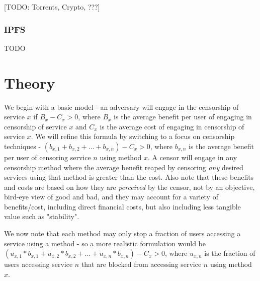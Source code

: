 \documentclass[12pt]{report}
\begin{document}
[TODO: Torrents, Crypto, ???]

\subsection{IPFS}

TODO

\chapter{Theory}
\label{theory}

We begin with a basic model - an adversary will engage in the censorship of service $x$ if $B_x - C_x > 0$, where $B_x$ is the average benefit per user of engaging in censorship of service $x$ and $C_x$ is the average cost of engaging in censorship of service $x$. We will refine this formula by switching to a focus on censorship techniques - $(b_{x,1} + b_{x,2} + ... + b_{x,n}) - C_x > 0$, where $b_{x,n}$ is the average benefit per user of censoring service $n$ using method $x$. A censor will engage in any censorship method where the average benefit reaped by censoring \emph{any} desired services using that method is greater than the cost. Also note that these benefits and costs are based on how they are \emph{perceived} by the censor, not by an objective, bird-eye view of good and bad, and they may account for a variety of benefits/cost, including direct financial costs, but also including less tangible value such as "stability".

We now note that each method may only stop a fraction of users accessing a service using a method - so a more realistic formulation would be $(u_{x,1}*b_{x,1} + u_{x,2}*b_{x,2} + ... + u_{x,n}*b_{x,n}) - C_x > 0$, where $u_{x,n}$ is the fraction of users accessing service $n$ that are blocked from accessing service $n$ using method $x$.
\end{document}
